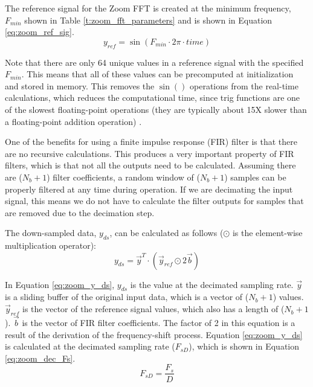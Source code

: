 The reference signal for the Zoom FFT is created at the minimum frequency, $F_{min}$ shown in Table \ref{t:zoom_fft_parameters} and is shown in Equation \ref{eq:zoom_ref_sig}.
\begin{equation} \label{eq:zoom_ref_sig}
	y_{ref} = \sin{(F_{min} \cdot 2\pi \cdot time)}
\end{equation}

Note that there are only 64 unique values in a reference signal with the specified $F_{min}$.  This means that all of these values can be precomputed at initialization and stored in memory.  This removes the $\sin{()}$ operations from the real-time calculations, which reduces the computational time, since trig functions are one of the slowest floating-point operations (they are typically about 15X slower than a floating-point addition operation) \cite{flops_performance}.

One of the benefits for using a finite impulse response (FIR) filter is that there are no recursive calculations.  This produces a very important property of FIR filters, which is that not all the outputs need to be calculated.  Assuming there are ($N_b+1$) filter coefficients, a random window of ($N_b+1$) samples can be properly filtered at any time during operation.  If we are decimating the input signal, this means we do not have to calculate the filter outputs for samples that are removed due to the decimation step.

The down-sampled data, $y_{ds}$, can be calculated as follows ($\odot$ is the element-wise multiplication operator):
\begin{equation} \label{eq:zoom_y_ds}
	y_{ds} = \vec{y}^T \cdot \left( \vec{y}_{ref} \odot 2\vec{b} \right)
\end{equation}

In Equation \ref{eq:zoom_y_ds},  $y_{ds}$ is the value at the decimated sampling rate.  $\vec{y}$ is a sliding buffer of the original input data, which is a vector of ($N_b+1$) values.  $\vec{y}_{ref}$ is the vector of the reference signal values, which also has a length of ($N_b+1$).  $\vec{b}$ is the vector of FIR filter coefficients.  The factor of 2 in this equation is a result of the derivation of the frequency-shift process.  Equation \ref{eq:zoom_y_ds} is calculated at the decimated sampling rate ($F_{sD}$), which is shown in Equation \ref{eq:zoom_dec_Fs}.
\begin{equation} \label{eq:zoom_dec_Fs}
	F_{sD} = \frac{F_s}{D}
\end{equation}

